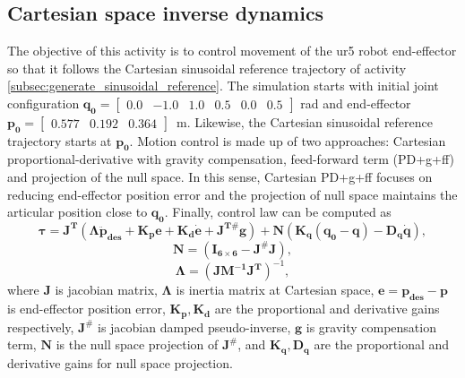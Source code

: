 \graphicspath{{images/act_2.1/}}
\subsection{Cartesian space inverse dynamics}
The objective of this activity is to control movement of the ur5 robot end-effector so that it follows the Cartesian sinusoidal reference trajectory of activity \ref{subsec:generate_sinusoidal_reference}. The simulation starts with initial joint configuration $\mathbf{q_0}=\begin{bmatrix} 0.0 & -1.0 & 1.0 & 0.5 & 0.0 & 0.5 \end{bmatrix}$ rad and end-effector $\mathbf{p_0}=\begin{bmatrix}  0.577 &   0.192 &   0.364 \end{bmatrix}$~m. Likewise, the Cartesian sinusoidal reference trajectory starts at $\mathbf{p_0}$. Motion control is made up of two approaches: Cartesian proportional-derivative with gravity compensation, feed-forward term (PD+g+ff) and projection of the null space. In this sense, Cartesian PD+g+ff focuses on reducing end-effector position error and the projection of null space maintains the articular position close to $\mathbf{q_0}$. Finally, control law can be computed as 
\begin{equation}
	\boldsymbol{\tau}
	= \mathbf{J^T} (\boldsymbol{\Lambda}\mathbf{\ddot{p}_{des}} +\mathbf{K_p e} + \mathbf{K_d \dot{e}}+ \mathbf{J^{T\#} g}) + \mathbf{N} \left(\mathbf{K_q(q_0-q) - D_q \dot{q}} \right),
	\label{eq:cartesian_PD_g_ff_N}
\end{equation}
\begin{equation*}
	\mathbf{N}=(\mathbf{I_{6 \times 6}} - \mathbf{J^{\#} J} ),
\end{equation*}
\begin{equation*}
	\boldsymbol{\Lambda}= (\mathbf{J M^{-1} J^{T}})^{-1},
\end{equation*}
\noindent where $\mathbf{J}$ is jacobian matrix, $\boldsymbol{\Lambda}$ is inertia matrix at Cartesian space, $\mathbf{e}=\mathbf{p_{des} - p}$ is end-effector position error, $\mathbf{K_p, K_d}$ are the proportional and derivative gains respectively, $\mathbf{J^{\#}}$ is jacobian damped pseudo-inverse, $\mathbf{g}$ is gravity compensation term, $\mathbf{N}$ is the null space projection of $\mathbf{J^{\#}}$, and $\mathbf{K_q, D_q}$ are the proportional and derivative gains for null space projection. \vspace{.5cm}